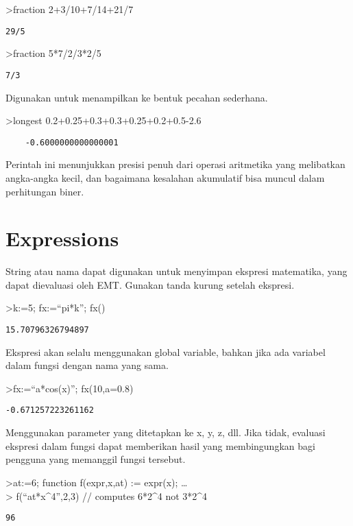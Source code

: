 \documentclass[
]{book}
\begin{document}
\textgreater fraction 2+3/10+7/14+21/7

\begin{verbatim}
29/5
\end{verbatim}

\textgreater fraction 5*7/2/3*2/5

\begin{verbatim}
7/3
\end{verbatim}

Digunakan untuk menampilkan ke bentuk pecahan sederhana.

\textgreater longest 0.2+0.25+0.3+0.3+0.25+0.2+0.5-2.6

\begin{verbatim}
    -0.6000000000000001 
\end{verbatim}

Perintah ini menunjukkan presisi penuh dari operasi aritmetika yang melibatkan angka-angka kecil, dan bagaimana kesalahan akumulatif bisa muncul dalam perhitungan biner.

\section{Expressions}\label{expressions}

String atau nama dapat digunakan untuk menyimpan ekspresi matematika, yang dapat dievaluasi oleh EMT. Gunakan tanda kurung setelah ekspresi.

\textgreater k:=5; fx:=``pi*k''; fx()

\begin{verbatim}
15.70796326794897
\end{verbatim}

Ekspresi akan selalu menggunakan global variable, bahkan jika ada variabel dalam fungsi dengan nama yang sama.

\textgreater fx:=``a*cos(x)''; fx(10,a=0.8)

\begin{verbatim}
-0.671257223261162
\end{verbatim}

Menggunakan parameter yang ditetapkan ke x, y, z, dll. Jika tidak, evaluasi ekspresi dalam fungsi dapat memberikan hasil yang membingungkan bagi pengguna yang memanggil fungsi tersebut.

\textgreater at:=6; function f(expr,x,at) := expr(x); \ldots{}\\
\textgreater{} f(``at*x\^{}4'',2,3) // computes 6*2\^{}4 not 3*2\^{}4

\begin{verbatim}
96
\end{verbatim}
\end{document}
